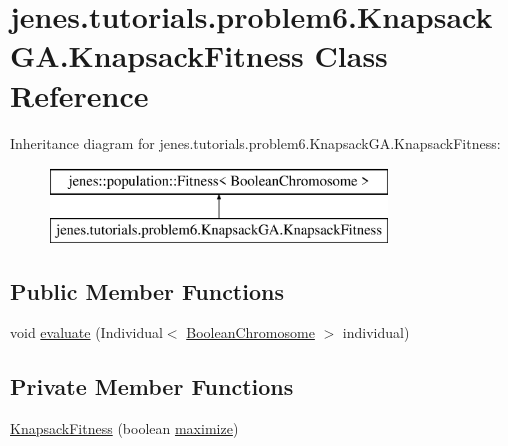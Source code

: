 \hypertarget{classjenes_1_1tutorials_1_1problem6_1_1_knapsack_g_a_1_1_knapsack_fitness}{\section{jenes.\-tutorials.\-problem6.\-Knapsack\-G\-A.\-Knapsack\-Fitness Class Reference}
\label{classjenes_1_1tutorials_1_1problem6_1_1_knapsack_g_a_1_1_knapsack_fitness}
}
Inheritance diagram for jenes.\-tutorials.\-problem6.\-Knapsack\-G\-A.\-Knapsack\-Fitness\-:\begin{figure}[H]
\begin{center}
\leavevmode
\includegraphics[height=2.000000cm]{classjenes_1_1tutorials_1_1problem6_1_1_knapsack_g_a_1_1_knapsack_fitness}
\end{center}
\end{figure}
\subsection*{Public Member Functions}
\begin{DoxyCompactItemize}
\item 
void \hyperlink{classjenes_1_1tutorials_1_1problem6_1_1_knapsack_g_a_1_1_knapsack_fitness_a4770eb011017fa41a4b296c19e1480aa}{evaluate} (Individual$<$ \hyperlink{classjenes_1_1chromosome_1_1_boolean_chromosome}{Boolean\-Chromosome} $>$ individual)
\end{DoxyCompactItemize}
\subsection*{Private Member Functions}
\begin{DoxyCompactItemize}
\item 
\hyperlink{classjenes_1_1tutorials_1_1problem6_1_1_knapsack_g_a_1_1_knapsack_fitness_adb0a278aa853f8fb7f9e0866c9620bce}{Knapsack\-Fitness} (boolean \hyperlink{classjenes_1_1tutorials_1_1problem6_1_1_knapsack_g_a_a09a22aca6ce24e19e04329f4e05be4fb}{maximize})
\end{DoxyCompactItemize}


